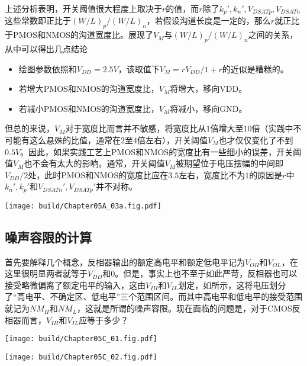 上述分析表明，开关阈值很大程度上取决于$r$的值，而$r$除了$k_p',k_n',V_{DSATp},V_{DSATn}$这些常数即正比于$(W/L)_p/(W/L)_n$，若假设沟道长度是一定的，那么$r$就正比于PMOS和NMOS的沟道宽度比。展现了$V_M$与$(W/L)_p/(W/L)_n$之间的关系，从中可以得出几点结论
\begin{itemize}
    \item 绘图参数依照和$V_{DD}=2.5\si{V}$，该取值下$V_M=rV_{DD}/1+r$的近似是糟糕的。
    \item 若增大PMOS和NMOS的沟道宽度比，$V_M$将增大，移向VDD。
    \item 若减小PMOS和NMOS的沟道宽度比，$V_M$将减小，移向GND。
\end{itemize}
但总的来说，$V_M$对于宽度比而言并不敏感，将宽度比从$1$倍增大至$10$倍（实践中不可能有这么悬殊的比值，通常在$2$至$4$倍左右），开关阈值$V_M$也才仅仅变化了不到$0.5\si{V}$。因此，如果实践工艺上PMOS和NMOS的宽度比有一些细小的误差，开关阈值$V_M$也不会有太大的影响。通常，开关阈值$V_{M}$被期望位于电压摆幅的中间即$V_{DD}/2$处，此时PMOS和NMOS的宽度比应在$3.5$左右，宽度比不为$1$的原因是$r$中$k_n',k_p'$和$V_{DSATn}',V_{DSATp}'$并不对称。

\begin{Figure}[CMOS反相器的开关阈值]
    \texttt{[image: build/Chapter05A\_03a.fig.pdf]}\hspace{0.7cm}
\end{Figure}

\subsection{噪声容限的计算}
首先要解释几个概念，反相器输出的额定高电平和额定低电平记为$V_{OH}$和$V_{OL}$，在这里很明显两者就等于$V_{DD}$和$0$。但是，事实上也不至于如此严苛，反相器也可以接受略微偏离了额定电平的输入，这由$V_{IH}$和$V_{IL}$划定，如所示，这将电压划分了“高电平、不确定区、低电平”三个范围区间。而其中高电平和低电平的接受范围就记为$NM_{H}$和$NM_{L}$，这就是所谓的噪声容限。现在面临的问题是，对于CMOS反相器而言，$V_{IH}$和$V_{IL}$应等于多少？

\begin{Figure}[CMOS反相器的噪声容限]
    \begin{FigureSub}[反相器逻辑电平的范围]
        \texttt{[image: build/Chapter05C\_01.fig.pdf]}
    \end{FigureSub}
    \hspace{0.5cm}
    \begin{FigureSub}[反相器VTC曲线的线性近似]
        \texttt{[image: build/Chapter05C\_02.fig.pdf]}
    \end{FigureSub}
\end{Figure}

